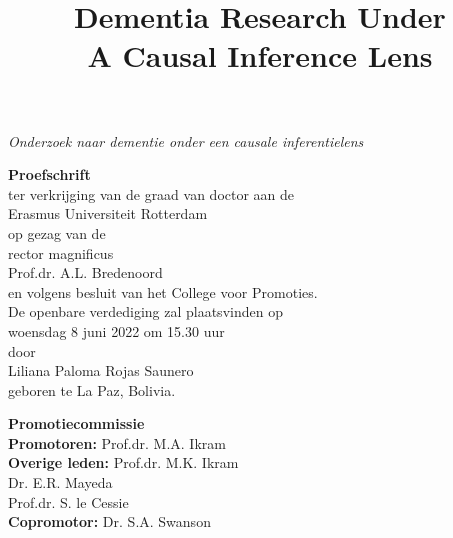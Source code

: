 \newpage
\thispagestyle{empty}
\begin{center}
\vspace{20mm}

\title{\textbf{\Large Dementia Research Under \\ \vspace{5mm} A Causal Inference Lens}}

\textit{\large Onderzoek naar dementie onder een causale inferentielens}

\vspace{10mm}
\textbf{\large{Proefschrift}}\\
\vspace{10mm}
ter verkrijging van de graad van doctor aan de\\
Erasmus Universiteit Rotterdam\\
op gezag van de\\
rector magnificus\\
\vspace{10mm}
Prof.dr. A.L. Bredenoord\\
\vspace{10mm}
en volgens besluit van het College voor Promoties.\\
De openbare verdediging zal plaatsvinden op\\
\vspace{10mm}
woensdag 8 juni 2022 om 15.30 uur\\
\vspace{10mm}
door\\
\vspace{10mm}
Liliana Paloma Rojas Saunero\\
geboren te La Paz, Bolivia. 
\end{center}


 

\newpage
\begin{flushleft}
\textbf{\large{Promotiecommissie}}\\
\vspace{10mm}
  \textbf{Promotoren:} \hspace{6mm} Prof.dr. M.A. Ikram \\
\vspace{10mm}
\textbf{Overige leden:} \hspace{3.5mm} Prof.dr. M.K. Ikram \\
\hspace{29mm} Dr. E.R. Mayeda \\
\hspace{29mm} Prof.dr. S. le Cessie\\
\vspace{10mm}
\textbf{Copromotor:} \hspace{6mm} Dr. S.A. Swanson\\
\end{flushleft}
\vspace*{\fill}



